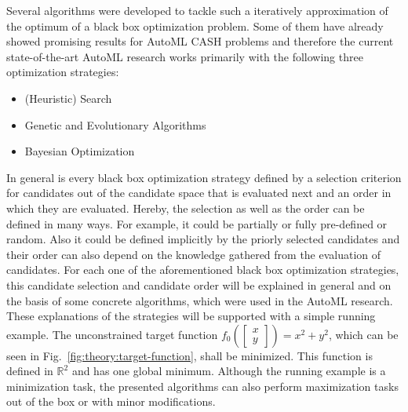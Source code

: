 Several algorithms were developed to tackle such a iteratively approximation of the optimum of a black box optimization problem.
Some of them have already showed promising results for AutoML CASH problems and therefore the current state-of-the-art AutoML research works primarily with the following three optimization strategies:
\begin{itemize}
    \item (Heuristic) Search
    \item Genetic and Evolutionary Algorithms
    \item Bayesian Optimization
\end{itemize}
In general is every black box optimization strategy defined by a selection criterion for candidates out of the candidate space that is evaluated next and an order in which they are evaluated.
Hereby, the selection as well as the order can be defined in many ways.
For example, it could be partially or fully pre-defined or random.
Also it could be defined implicitly by the priorly selected candidates and their order can also depend on the knowledge gathered from the evaluation of candidates.\newline
For each one of the aforementioned black box optimization strategies, this candidate selection and candidate order will be explained in general and on the basis of some concrete algorithms, which were used in the AutoML research.
These explanations of the strategies will be supported with a simple running example.
The unconstrained target function $f_0 \left( \begin{bmatrix}x\\y \end{bmatrix} \right) = x^2 + y^2$, which can be seen in Fig.~\ref{fig:theory:target-function}, shall be minimized.
This function is defined in $\mathbb{R}^2$ and has one global minimum.
Although the running example is a minimization task, the presented algorithms can also perform maximization tasks out of the box or with minor modifications.
